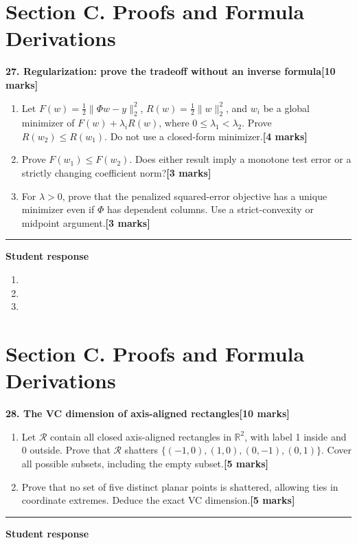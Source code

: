 \documentclass[11pt,a4paper]{article}
\newlength{\BlankAnswerHeight}\setlength{\BlankAnswerHeight}{16mm}
\newcommand{\AnswerBlank}{\leavevmode\par\vspace{\BlankAnswerHeight}}
\begin{document}
\newpage\section*{Section C. Proofs and Formula Derivations}
\textbf{27. Regularization: prove the tradeoff without an inverse formula}\hfill\textbf{[10 marks]}\par\medskip
\begin{enumerate}[label=(\alph*),leftmargin=8mm,itemsep=3pt]
\item Let \(F(w)=\tfrac12\|\Phi w-y\|_2^2\), \(R(w)=\tfrac12\|w\|_2^2\), and \(w_i\) be a global minimizer of \(F(w)+\lambda_iR(w)\), where \(0\leq\lambda_1<\lambda_2\). Prove \(R(w_2)\leq R(w_1)\). Do not use a closed-form minimizer.\hfill\textbf{[4 marks]}
\item Prove \(F(w_1)\leq F(w_2)\). Does either result imply a monotone test error or a strictly changing coefficient norm?\hfill\textbf{[3 marks]}
\item For \(\lambda>0\), prove that the penalized squared-error objective has a unique minimizer even if \(\Phi\) has dependent columns. Use a strict-convexity or midpoint argument.\hfill\textbf{[3 marks]}
\end{enumerate}\par\medskip\hrule\medskip\textbf{Student response}\par
\begin{enumerate}[label=(\alph*),leftmargin=8mm,itemsep=3pt]
\item
\AnswerBlank
\item
\AnswerBlank
\item
\AnswerBlank
\end{enumerate}
\newpage\section*{Section C. Proofs and Formula Derivations}
\textbf{28. The VC dimension of axis-aligned rectangles}\hfill\textbf{[10 marks]}\par\medskip
\begin{enumerate}[label=(\alph*),leftmargin=8mm,itemsep=3pt]
\item Let \(\mathcal R\) contain all closed axis-aligned rectangles in \(\mathbb R^2\), with label 1 inside and 0 outside. Prove that \(\mathcal R\) shatters \(\{(-1,0),(1,0),(0,-1),(0,1)\}\). Cover all possible subsets, including the empty subset.\hfill\textbf{[5 marks]}
\item Prove that no set of five distinct planar points is shattered, allowing ties in coordinate extremes. Deduce the exact VC dimension.\hfill\textbf{[5 marks]}
\end{enumerate}\par\medskip\hrule\medskip\textbf{Student response}\par
\end{document}
